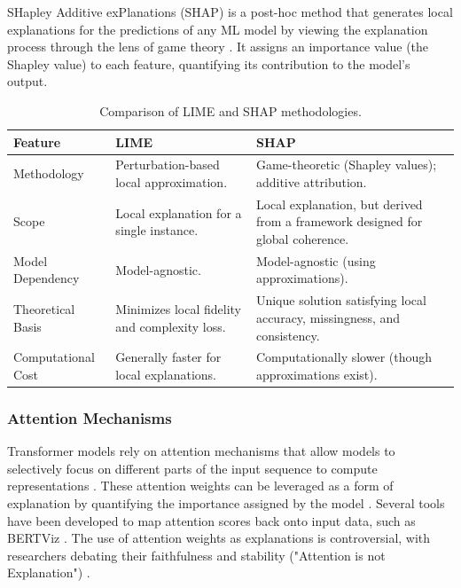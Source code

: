 SHapley Additive exPlanations (SHAP) is a post-hoc method that generates local explanations for the predictions of any ML model \cite{SoKBhusal_2023} by viewing the explanation process through the lens of game theory \cite{Unified}. It assigns an importance value (the Shapley value) to each feature, quantifying its contribution to the model's output.

\begin{table}[H]
\centering
\small
\begin{tabular}{|l|p{5.5cm}|p{5.5cm}|}
\hline
\textbf{Feature} & \textbf{LIME} & \textbf{SHAP} \\
\hline
Methodology & Perturbation-based local approximation. & Game-theoretic (Shapley values); additive attribution. \\
Scope & Local explanation for a single instance. & Local explanation, but derived from a framework designed for global coherence. \\
Model Dependency & Model-agnostic. & Model-agnostic (using approximations). \\
Theoretical Basis & Minimizes local fidelity and complexity loss. & Unique solution satisfying local accuracy, missingness, and consistency. \\
Computational Cost & Generally faster for local explanations. & Computationally slower (though approximations exist). \\
\hline
\end{tabular}
\caption{Comparison of LIME and SHAP methodologies.}
\end{table}

\subsubsection{Attention Mechanisms}
Transformer models rely on attention mechanisms that allow models to selectively focus on different parts of the input sequence to compute representations \cite{SoKBhusal_2023,XAImersha2024}. These attention weights can be leveraged as a form of explanation by quantifying the importance assigned by the model \cite{XAImersha2024}.
Several tools have been developed to map attention scores back onto input data, such as BERTViz \cite{BertViz}. The use of attention weights as explanations is controversial, with researchers debating their faithfulness and stability ("Attention is not Explanation") \cite{AttentionNotExplanation}.

